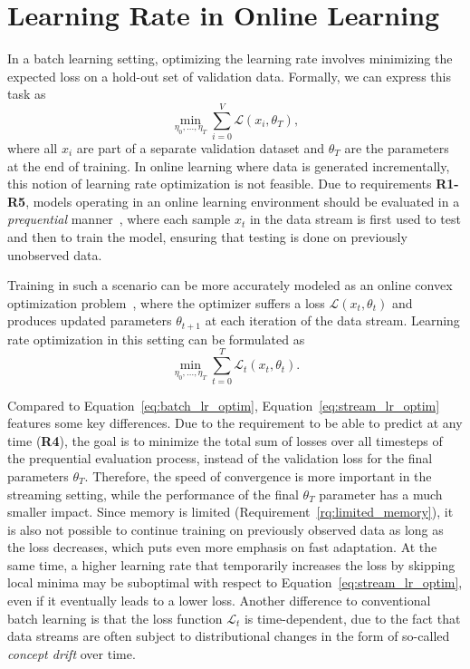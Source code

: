 \documentclass{article} %
\begin{document}
\section{Learning Rate in Online Learning}

In a batch learning setting, optimizing the learning rate involves minimizing the expected loss on a hold-out set of validation data.
Formally, we can express this task as
\begin{equation}
   \label{eq:batch_lr_optim}
   \min_{\eta_0, \ldots, \eta_T} \sum_{i=0}^V \mathcal{L}(x_i, \theta_T),
\end{equation}
where all $x_i$ are part of a separate validation dataset and $\theta_T$ are the parameters at the end of training.
In online learning where data is generated incrementally, this notion of learning rate optimization is not feasible.
Due to requirements \textbf{R1-R5}, models operating in an online learning environment should be evaluated in a \textit{prequential} manner~\citep{bifetMOAMassiveOnline2010}, where each sample $x_t$ in the data stream is first used to test and then to train the model, ensuring that testing is done on previously unobserved data.

Training in such a scenario can be more accurately modeled as an online convex optimization problem~\citep{shalev-shwartzOnlineLearningOnline2011,hazanIntroductionOnlineConvex2016}, where the optimizer suffers a loss $\mathcal{L}(x_t, \theta_{t})$ and produces updated parameters $\theta_{t+1}$ at each iteration of the data stream.
Learning rate optimization in this setting can be formulated as
\begin{equation}
   \label{eq:stream_lr_optim}
   \min_{\eta_0, \ldots, \eta_T} \sum_{t=0}^{T} \mathcal{L}_t(x_t,\theta_t).
\end{equation}

Compared to Equation~\eqref{eq:batch_lr_optim}, Equation~\eqref{eq:stream_lr_optim} features some key differences.
Due to the requirement to be able to predict at any time (\textbf{R4}), the goal is to minimize the total sum of losses over all timesteps of the prequential evaluation process, instead of the validation loss for the final parameters $\theta_T$.
Therefore, the speed of convergence is more important in the streaming setting, while the performance of the final $\theta_T$ parameter has a much smaller impact.
Since memory is limited (Requirement~\ref{rq:limited_memory}), it is also not possible to continue training on previously observed data as long as the loss decreases, which puts even more emphasis on fast adaptation.
At the same time, a higher learning rate that temporarily increases the loss by skipping local minima may be suboptimal with respect to Equation~\eqref{eq:stream_lr_optim}, even if it eventually leads to a lower loss.
Another difference to conventional batch learning is that the loss function $\mathcal{L}_t$ is time-dependent, due to the fact that data streams are often subject to distributional changes in the form of so-called \textit{concept drift} over time.
\end{document}
